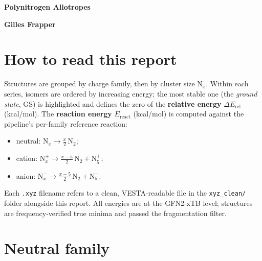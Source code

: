 \documentclass[11pt,a4paper]{article}
\begin{document}
\begin{titlepage}\centering\vspace*{3cm}
{\Huge\bfseries\color{accent} Polynitrogen Allotropes\par}
\vspace{0.6em}{\Large Screened structures: energies and depictions\par}
\vspace{2em}{\large Neutral, anionic and cationic N$_x$ clusters\par}
\vspace{1em}{\large ground states and metastable isomers\par}
\vfill{\bfseries\Large Gilles Frapper\par}
\vspace{0.5em}{\small IC2MP, UMR 7285 CNRS, University of Poitiers\par}
\end{titlepage}
\tableofcontents\newpage
\section*{How to read this report}
Structures are grouped by charge family, then by cluster size N$_x$. Within each series, isomers are ordered by increasing energy; the most stable one (the \emph{ground state}, GS) is highlighted and defines the zero of the \textbf{relative energy} $\Delta E_\text{rel}$ (kcal/mol). The \textbf{reaction energy} $E_\text{react}$ (kcal/mol) is computed against the pipeline's per-family reference reaction:
\begin{itemize}
\item neutral: $\mathrm{N}_x \rightarrow \tfrac{x}{2}\,\mathrm{N}_2$;
\item cation: $\mathrm{N}_x^{+} \rightarrow \tfrac{x-5}{2}\,\mathrm{N}_2 + \mathrm{N}_5^{+}$;
\item anion: $\mathrm{N}_x^{-} \rightarrow \tfrac{x-5}{2}\,\mathrm{N}_2 + \mathrm{N}_5^{-}$.
\end{itemize}
Each \texttt{.xyz} filename refers to a clean, VESTA-readable file in the \texttt{xyz\_clean/} folder alongside this report. All energies are at the GFN2-xTB level; structures are frequency-verified true minima and passed the fragmentation filter.
\newpage
\section{Neutral family}
\end{document}
